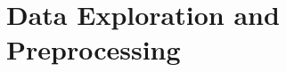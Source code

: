 \documentclass{article}
\numberwithin{equation}{section}
\theoremstyle{definition}
\theoremstyle{plain}
\theoremstyle{definition}
\theoremstyle{remark}
\begin{document}
\section{Data Exploration and Preprocessing}



\end{document}
